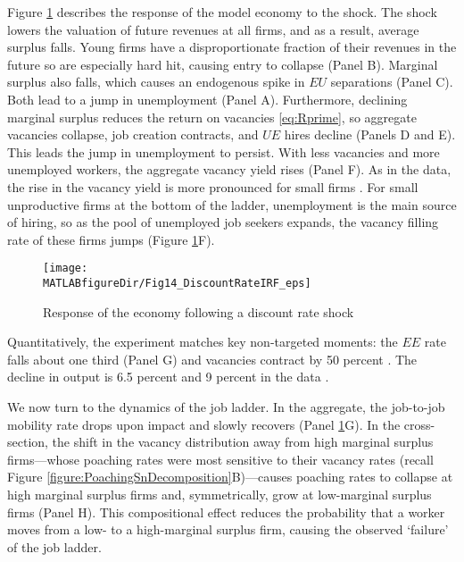 Figure \ref{fig:GRag} describes the response of the model economy to the shock.
The shock lowers the valuation of future revenues at all firms, and as a result, average surplus falls.
Young firms have a disproportionate fraction of their revenues in the future so are especially hard hit, causing entry to collapse (Panel B).
Marginal surplus also falls, which causes an endogenous spike in $EU$ separations (Panel C).
Both lead to a jump in unemployment (Panel A).
Furthermore, declining marginal surplus reduces the return on vacancies \eqref{eq:Rprime}, so aggregate vacancies collapse, job creation contracts, and $UE$ hires decline (Panels D and E).
This leads the jump in unemployment to persist.
With less vacancies and more unemployed workers, the aggregate vacancy yield rises (Panel F).
As in the data, the rise in the vacancy yield is more pronounced for small firms \citep{moscapv}.
For small unproductive firms at the bottom of the ladder, unemployment is the main source of hiring, so as the pool of unemployed job seekers expands, the vacancy filling rate of these firms jumps (Figure \ref{fig:GRag}F).

\begin{figure}[ttt]
\begin{center}
\vspace*{-1cm}
\hspace*{-1cm}
\texttt{[image: \\MATLABfigureDir/Fig14\_DiscountRateIRF\_eps]}
\vspace*{-0.5cm}
\caption{Response of the economy following a discount rate shock}\label{fig:GRag}
\vspace*{-.5cm}
\end{center}
\end{figure}


Quantitatively, the experiment matches key non-targeted moments: the $EE$ rate falls about one third (Panel G) and vacancies contract by 50 percent \citep{Gavazza2018}.
The decline in output is 6.5 percent and 9 percent in the data \citep{fernald_NBERannual}.

We now turn to the dynamics of the job ladder.
In the aggregate, the job-to-job mobility rate drops upon impact and slowly recovers (Panel \ref{fig:GRag}G).
In the cross-section, the shift in the vacancy distribution away from high marginal surplus firms---whose poaching rates were most sensitive to their vacancy rates (recall Figure \ref{figure:PoachingSnDecomposition}B)---causes poaching rates to collapse at high marginal surplus firms and, symmetrically, grow at low-marginal surplus firms (Panel H).
This compositional effect reduces the probability that a worker moves from a low- to a high-marginal surplus firm, causing the observed `failure' of the job ladder.

